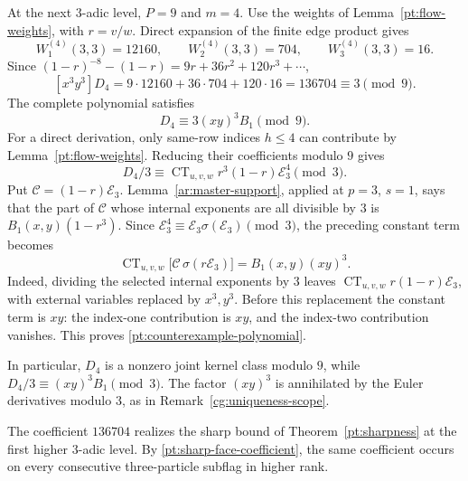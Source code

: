 \documentclass[11pt]{amsart}
\theoremstyle{definition}
\theoremstyle{remark}
\numberwithin{equation}{section}
\DeclareMathOperator{\CT}{CT}
\begin{document}
At the next $3$-adic level, $P=9$ and $m=4$.
Use the weights of Lemma~\ref{pt:flow-weights}, with $r=v/w$.
Direct expansion of the finite edge product gives
\[
 W_1^{(4)}(3,3)=12160,\qquad
 W_2^{(4)}(3,3)=704,\qquad
 W_3^{(4)}(3,3)=16.
\]
Since $(1-r)^{-8}-(1-r)=9r+36r^2+120r^3+\cdots$,
\begin{equation}\label{pt:counterexample-coefficient}
 [x^3y^3]D_4
 =9\cdot12160+36\cdot704+120\cdot16
 =136704\equiv3\pmod9.
\end{equation}
The complete polynomial satisfies
\begin{equation}\label{pt:counterexample-polynomial}
 D_4\equiv3(xy)^3B_1\pmod9.
\end{equation}
For a direct derivation, only same-row indices $h\leq4$ can
contribute by Lemma~\ref{pt:flow-weights}. Reducing their
coefficients modulo $9$ gives
\[
 D_4/3\equiv\CT_{u,v,w}r^3(1-r)\mathscr E_3^4\pmod3.
\]
Put $\mathscr C=(1-r)\mathscr E_3$.
Lemma~\ref{ar:master-support}, applied at $p=3$, $s=1$,
says that the part of $\mathscr C$ whose internal exponents
are all divisible by $3$ is $B_1(x,y)(1-r^3)$.
Since $\mathscr E_3^4\equiv\mathscr E_3\sigma(\mathscr E_3)
\pmod3$, the preceding constant term becomes
\[
 \CT_{u,v,w}\bigl[\mathscr C\,\sigma(r\mathscr E_3)\bigr]
 =B_1(x,y)(xy)^3.
\]
Indeed, dividing the selected internal exponents by $3$ leaves
$\CT_{u,v,w}r(1-r)\mathscr E_3$, with external variables
replaced by $x^3,y^3$. Before this replacement the constant
term is $xy$: the index-one contribution is $xy$, and the
index-two contribution vanishes.
This proves \eqref{pt:counterexample-polynomial}.

In particular, $D_4$ is a nonzero joint kernel class
modulo $9$, while
$D_4/3\equiv(xy)^3B_1\pmod3$. The factor $(xy)^3$ is
annihilated by the Euler derivatives modulo $3$, as in
Remark~\ref{cg:uniqueness-scope}.

The coefficient $136704$ realizes the sharp bound of
Theorem~\ref{pt:sharpness} at the first higher $3$-adic level.
By \eqref{pt:sharp-face-coefficient}, the same coefficient occurs
on every consecutive three-particle subflag in higher rank.
\end{document}
